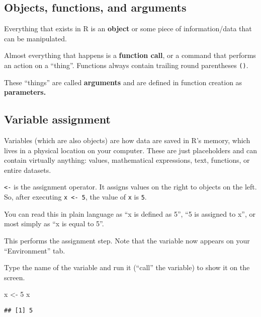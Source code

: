 \documentclass[
]{article}
\newenvironment{Shaded}{\begin{snugshade}}{\end{snugshade}}
\newcommand{\DecValTok}[1]{\textcolor[rgb]{0.00,0.00,0.81}{#1}}
\newcommand{\NormalTok}[1]{#1}
\newcommand{\OtherTok}[1]{\textcolor[rgb]{0.56,0.35,0.01}{#1}}
\begin{document}
\hypertarget{objects-functions-and-arguments}{%
\subsection{Objects, functions, and
arguments}\label{objects-functions-and-arguments}}

Everything that exists in R is an \textbf{object} or some piece of
information/data that can be manipulated.

Almost everything that happens is a \textbf{function call}, or a command
that performs an action on a ``thing''. Functions always contain
trailing round parentheses \texttt{()}.

These ``things'' are called \textbf{arguments} and are defined in
function creation as \textbf{parameters.}

\hypertarget{variable-assignment}{%
\subsection{Variable assignment}\label{variable-assignment}}

Variables (which are also objects) are how data are saved in R's memory,
which lives in a physical location on your computer. These are just
placeholders and can contain virtually anything: values, mathematical
expressions, text, functions, or entire datasets.

\texttt{\textless{}-} is the assignment operator. It assigns values on
the right to objects on the left. So, after executing
\texttt{x\ \textless{}-\ 5}, the value of \texttt{x} is \texttt{5}.

You can read this in plain language as ``x is defined as 5'', ``5 is
assigned to x'', or most simply as ``x is equal to 5''.

This performs the assignment step. Note that the variable now appears on
your ``Environment'' tab.

Type the name of the variable and run it (``call'' the variable) to show
it on the screen.

\begin{Shaded}
\begin{Highlighting}[]
\NormalTok{x }\OtherTok{\textless{}{-}} \DecValTok{5}
\NormalTok{x}
\end{Highlighting}
\end{Shaded}

\begin{verbatim}
## [1] 5
\end{verbatim}
\end{document}
